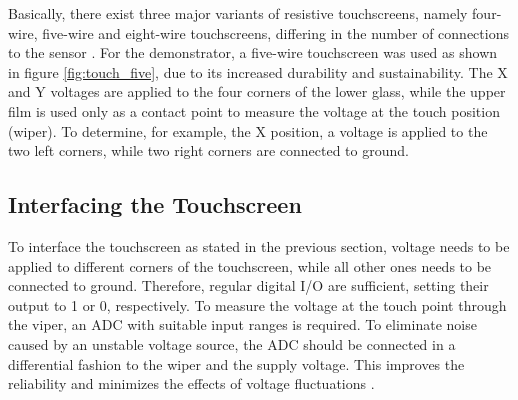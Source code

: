 Basically, there exist three major variants of resistive touchscreens, namely
four-wire, five-wire and eight-wire touchscreens, differing in the number of
connections to the sensor \citep{Wal12}. For the demonstrator, a five-wire
touchscreen was used as shown in figure \ref{fig:touch_five}, due to its
increased durability and sustainability. The X and Y voltages are applied to
the four corners of the lower glass, while the upper film is used only as a
contact point to measure the voltage at the touch position (wiper). To
determine, for example, the X position, a voltage is applied to the two left
corners, while two right corners are connected to ground.

\subsection{Interfacing the Touchscreen}
To interface the touchscreen as stated in the previous section, voltage needs
to be applied to different corners of the touchscreen, while all other ones
needs to be connected to ground. Therefore, regular digital I/O are
sufficient, setting their output to 1 or 0, respectively. To measure the
voltage at the touch point through the viper, an \ac{ADC} with suitable input
ranges is required. To eliminate noise caused by an unstable voltage source,
the \ac{ADC} should be connected in a differential fashion to the wiper and
the supply voltage. This improves the reliability and minimizes the effects of
voltage fluctuations \citep{OOD00}.

